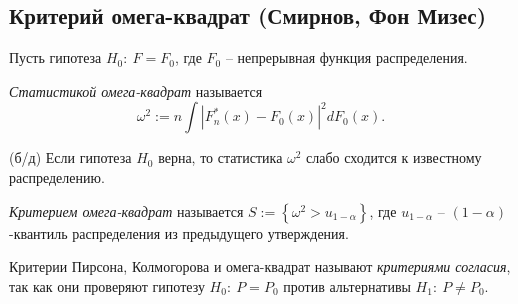 \subsection{Критерий омега-квадрат (Смирнов, Фон Мизес)}

Пусть гипотеза $\displaystyle H_{0} :\ F=F_{0}$, где $\displaystyle F_{0}$ -- непрерывная функция распределения.
\begin{definition}
    \textit{Статистикой омега-квадрат} называется
    \begin{equation*}
        \omega ^{2} :=n\int \left| F_{n}^{*}( x) -F_{0}( x)\right| ^{2} dF_{0}( x) .
    \end{equation*}
\end{definition}
\begin{proposition} (б/д)
    Если гипотеза $\displaystyle H_{0}$ верна, то статистика $\displaystyle \omega ^{2}$ слабо сходится к известному распределению.
\end{proposition}
\begin{definition}
    \textit{Критерием омега-квадрат} называется $\displaystyle S:=\left\{\omega ^{2}  >u_{1-\alpha }\right\}$, где $\displaystyle u_{1-\alpha }$ -- $\displaystyle ( 1-\alpha )$-квантиль распределения из предыдущего утверждения.
\end{definition}
\begin{definition}
    Критерии Пирсона, Колмогорова и омега-квадрат называют \textit{критериями согласия}, так как они проверяют гипотезу $\displaystyle H_{0} :\ P=P_{0}$ против альтернативы $\displaystyle H_{1} :\ P\neq P_{0}$.
\end{definition}